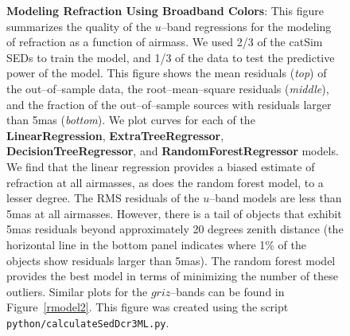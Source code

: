 \documentclass[DM,toc]{lsstdoc}
\begin{document}
\begin{figure}[!t]
    \centering
    \caption{\textbf{Modeling Refraction Using Broadband Colors}: This
      figure summarizes the quality of the $u$--band regressions for
      the modeling of refraction as a function of airmass.  We used
      2/3 of the catSim SEDs to train the model, and 1/3 of the data
      to test the predictive power of the model.  This figure shows
      the mean residuals (\textit{top}) of the out--of--sample data, the
      root--mean--square residuals (\textit{middle}), and the fraction of
      the out--of--sample sources with residuals larger than 5mas
      (\textit{bottom}).  We plot curves for each of the
      \textbf{LinearRegression}, \textbf{ExtraTreeRegressor},
      \textbf{DecisionTreeRegressor}, and \textbf{RandomForestRegressor}
      models.  We find that the linear regression provides a biased
      estimate of refraction at all airmasses, as does the random
      forest model, to a lesser degree.  The RMS residuals of the
      $u$--band models are less than 5mas at all airmasses.  However,
      there is a tail of objects that exhibit 5mas residuals beyond
      approximately 20 degrees zenith distance (the horizontal line in
      the bottom panel indicates where 1\% of the objects show
      residuals larger than 5mas).  The random forest model provides
      the best model in terms of minimizing the number of these
      outliers.  Similar plots for the $griz$--bands can be found in
      Figure~\ref{rmodel2}.  This figure was created using the script
      \texttt{python/calculateSedDcr3ML.py}.}
    \label{rmodel}
\end{figure}
\end{document}
